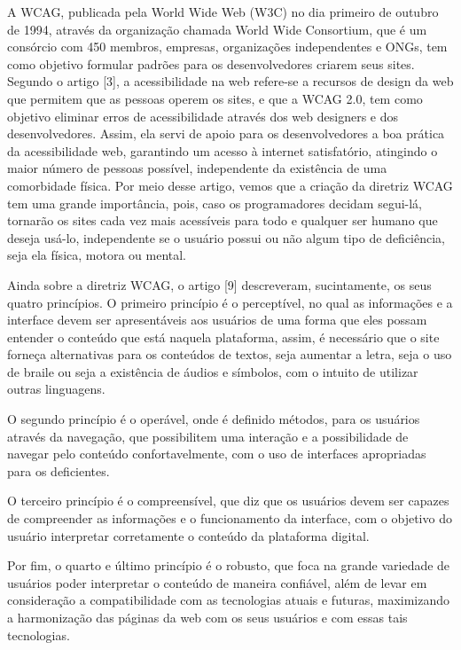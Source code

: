 \documentclass[a4paper]{article}
\begin{document}
\begin{titlepage}
A WCAG, publicada pela World Wide Web (W3C) no dia primeiro de outubro de 1994, através da organização chamada World Wide Consortium, que é um consórcio com 450 membros, empresas, organizações independentes e ONGs, tem como objetivo formular padrões para os desenvolvedores criarem seus sites. Segundo o artigo [3], a acessibilidade na web refere-se a recursos de design da web que permitem que as pessoas operem os sites, e que a WCAG 2.0, tem como objetivo eliminar erros de acessibilidade através dos web designers e dos desenvolvedores. Assim, ela servi de apoio para os desenvolvedores a boa prática da acessibilidade web, garantindo um acesso à internet satisfatório, atingindo o maior número de pessoas possível, independente da existência de uma comorbidade física. Por meio desse artigo, vemos que a criação da diretriz WCAG tem uma grande importância, pois, caso os programadores decidam segui-lá, tornarão os sites cada vez mais acessíveis para todo e qualquer ser humano que deseja usá-lo, independente se o usuário possui ou não algum tipo de deficiência, seja ela física, motora ou mental. 

Ainda sobre a diretriz WCAG, o artigo [9] descreveram, sucintamente, os seus quatro princípios. O primeiro princípio é o perceptível, no qual as informações e a interface devem ser apresentáveis aos usuários de uma forma que eles possam entender o conteúdo que está naquela plataforma, assim, é necessário que o site forneça alternativas para os conteúdos de textos, seja aumentar a letra, seja o uso de braile ou seja a existência de áudios e símbolos, com o intuito de utilizar outras linguagens.

O segundo princípio é o operável, onde é definido métodos, para os usuários através da navegação, que possibilitem uma interação e a possibilidade de navegar pelo conteúdo confortavelmente, com o uso de interfaces apropriadas para os deficientes.

O terceiro princípio é o compreensível, que diz que os usuários devem ser capazes de compreender as informações e o funcionamento da interface, com o objetivo do usuário interpretar corretamente o conteúdo da plataforma digital.

Por fim, o quarto e último princípio é o robusto, que foca na grande variedade de usuários poder interpretar o conteúdo de maneira confiável, além de levar em consideração a compatibilidade com as tecnologias atuais e futuras, maximizando a harmonização das páginas da web com os seus usuários e com essas tais tecnologias.


\end{titlepage}
\end{document}

